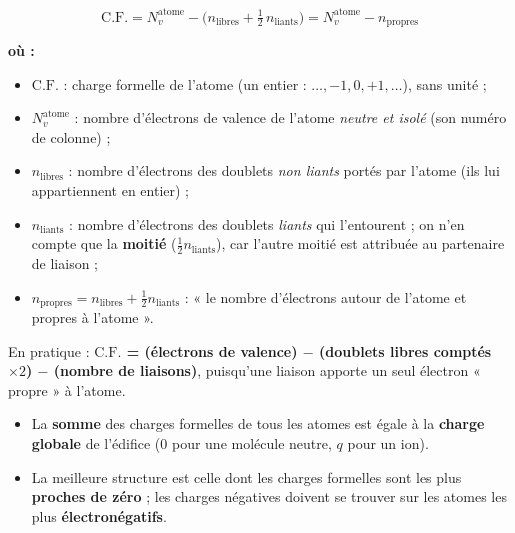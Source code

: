 \documentclass[11pt,a4paper]{article}
\newenvironment{ou}{%
  \par\smallskip\noindent\textbf{où :}\nopagebreak
  \begin{itemize}[leftmargin=1.8em,topsep=2pt,itemsep=1.5pt,parsep=0pt]}%
  {\end{itemize}}
\newcommand{\CF}{\ensuremath{\mathrm{C.F.}}}
\begin{document}
\begin{formule}
\[ \boxed{\;\CF = N_{v}^{\text{atome}} - \Big(n_{\text{libres}} + \tfrac{1}{2}\,n_{\text{liants}}\Big)
   = N_{v}^{\text{atome}} - n_{\text{propres}}\;} \]
\begin{ou}
  \item $\CF$ : charge formelle de l'atome (un entier : $\dots,-1,0,+1,\dots$), sans unité ;
  \item $N_{v}^{\text{atome}}$ : nombre d'électrons de valence de l'atome \emph{neutre et isolé}
        (son numéro de colonne) ;
  \item $n_{\text{libres}}$ : nombre d'électrons des doublets \emph{non liants} portés par
        l'atome (ils lui appartiennent en entier) ;
  \item $n_{\text{liants}}$ : nombre d'électrons des doublets \emph{liants} qui l'entourent ; on
        n'en compte que la \textbf{moitié} ($\tfrac12 n_{\text{liants}}$), car l'autre moitié est
        attribuée au partenaire de liaison ;
  \item $n_{\text{propres}} = n_{\text{libres}} + \tfrac12 n_{\text{liants}}$ : « le nombre
        d'électrons autour de l'atome et propres à l'atome ».
\end{ou}
En pratique : \textbf{\CF{} = (électrons de valence) $-$ (doublets libres comptés $\times 2$) $-$
(nombre de liaisons)}, puisqu'une liaison apporte un seul électron « propre » à l'atome.
\end{formule}

\begin{theoreme}
\begin{itemize}[leftmargin=1.6em,topsep=2pt,itemsep=2pt]
  \item La \textbf{somme} des charges formelles de tous les atomes est égale à la \textbf{charge
        globale} de l'édifice ($0$ pour une molécule neutre, $q$ pour un ion).
  \item La meilleure structure est celle dont les charges formelles sont les plus \textbf{proches
        de zéro} ; les charges négatives doivent se trouver sur les atomes les plus
        \textbf{électronégatifs}.
\end{itemize}
\end{theoreme}
\end{document}
